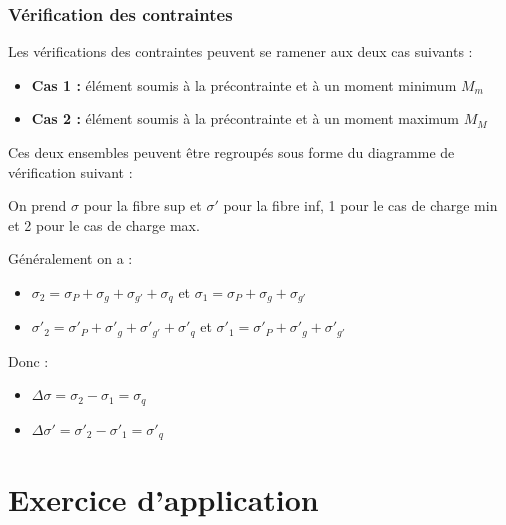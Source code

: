 \documentclass[12pt,a4paper]{article}
\begin{document}
\subsubsection{Vérification des contraintes}

Les vérifications des contraintes peuvent se ramener aux deux cas suivants :

\begin{itemize}
    \item \textbf{Cas 1 :} élément soumis à la précontrainte et à un moment minimum $M_m$
    \item \textbf{Cas 2 :} élément soumis à la précontrainte et à un moment maximum $M_M$
\end{itemize}

Ces deux ensembles peuvent être regroupés sous forme du diagramme de vérification suivant :

On prend $\sigma$ pour la fibre sup et $\sigma'$ pour la fibre inf, 1 pour le cas de charge min et 2 pour le cas de charge max.

Généralement on a :
\begin{itemize}
    \item $\sigma_2 = \sigma_P + \sigma_g + \sigma_{g'} + \sigma_q$ et $\sigma_1 = \sigma_P + \sigma_g + \sigma_{g'}$
    \item $\sigma'_2 = \sigma'_P + \sigma'_g + \sigma'_{g'} + \sigma'_q$ et $\sigma'_1 = \sigma'_P + \sigma'_g + \sigma'_{g'}$
\end{itemize}

Donc :
\begin{itemize}
    \item $\Delta \sigma = \sigma_2 - \sigma_1 = \sigma_q$
    \item $\Delta \sigma' = \sigma'_2 - \sigma'_1 = \sigma'_q$
\end{itemize}

\section{Exercice d'application}
\end{document}
